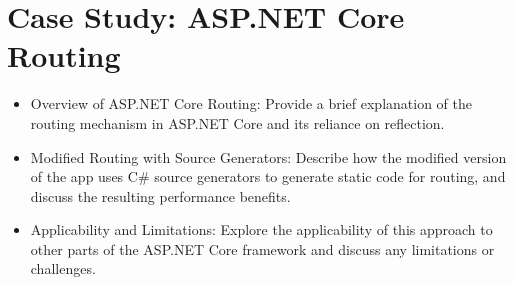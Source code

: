 \chapter{Case Study: ASP.NET Core Routing}
\begin{itemize}
    \item Overview of ASP.NET Core Routing: Provide a brief explanation of the routing mechanism in ASP.NET Core and its reliance on reflection.
    \item Modified Routing with Source Generators: Describe how the modified version of the app uses C\# source generators to generate static code for routing, and discuss the resulting performance benefits.
    \item Applicability and Limitations: Explore the applicability of this approach to other parts of the ASP.NET Core framework and discuss any limitations or challenges.
\end{itemize}